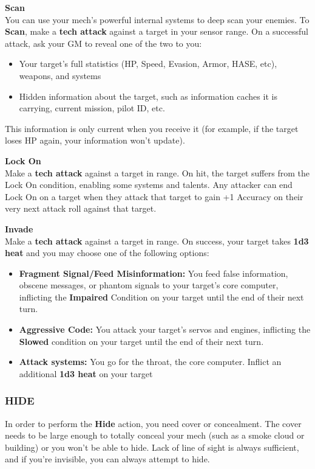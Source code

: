 \textbf{Scan}\\
You can use your mech’s powerful internal systems to deep scan your enemies.
To \textbf{Scan}, make a \textbf{tech attack} against a target in your sensor range. On a successful attack, ask your GM to reveal one of the two to you:
\begin{itemize}
    \item Your target’s full statistics (HP, Speed, Evasion, Armor, HASE, etc), weapons, and systems
    \item Hidden information about the target, such as information caches it is carrying, current mission, pilot ID, etc. 
\end{itemize}
This information is only current when you receive it (for example, if the target loses HP again, your information won’t update).

\textbf{Lock On}\\
Make a \textbf{tech attack} against a target in range. On hit, the target suffers from the Lock On condition, enabling some systems and talents. Any attacker can end Lock On on a target when they attack that target to gain +1 Accuracy on their very next attack roll against that target.

\textbf{Invade}\\
Make a \textbf{tech attack} against a target in range. On success, your target takes \textbf{1d3 heat} and you may choose one of the following options:
\begin{itemize}
\item \textbf{Fragment Signal/Feed Misinformation:} You feed false information, obscene messages, or phantom signals to your target’s core computer, inflicting the \textbf{Impaired} Condition on your target until the end of their next turn.
\item \textbf{Aggressive Code:} You attack your target’s servos and engines, inflicting the \textbf{Slowed} condition on your target until the end of their next turn.
\item \textbf{Attack systems:} You go for the throat, the core computer. Inflict an additional \textbf{1d3 heat} on your target
\end{itemize}


\subsubsection{HIDE}

In order to perform the \textbf{Hide} action, you need cover or concealment. The cover needs to be large enough to totally conceal your mech (such as a smoke cloud or building) or you won’t be able to hide. Lack of line of sight is always sufficient, and if you’re invisible, you can always attempt to hide.

